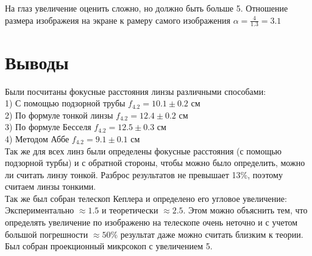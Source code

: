 На глаз увеличение оценить сложно, но должно быть больше 5.
Отношение размера изображеия на экране к рамеру самого изображения $\alpha = \frac{4}{1.3} = 3.1$

\section*{Выводы}
\indent Были посчитаны фокусные расстояния линзы различными способами:\\
1) С помощью подзорной трубы $f_{4.2} = 10.1 \pm 0.2$ см\\
2) По формуле тонкой линзы $f_{4.2} = 12.4 \pm 0.2$ см\\
3) По формуле Бесселя $f_{4.2} = 12.5 \pm 0.3$ см\\
4) Методом Аббе $f_{4.2} = 9.1 \pm 0.1$ см\\

Так же для всех линз были определены фокусные расстояния (с помощью подзорной турбы) и с обратной стороны, чтобы можно было определить, можно ли считать линзу тонкой.
Разброс результатов не превышает 13\%, поэтому считаем линзы тонкими.\\
\indent Так же был собран телескоп Кеплера и определено его угловое увеличение: Экспериментально $\approx 1.5$ и теоретически $\approx 2.5$. Этом можно объяснить тем, что определять увеличение по изображеню на телескопе очень неточно и с учетом большой погрешности $\approx 50\%$ результат даже можно считать близким к теории.\\
\indent Был собран проекционный микрсокоп с увеличением 5.




